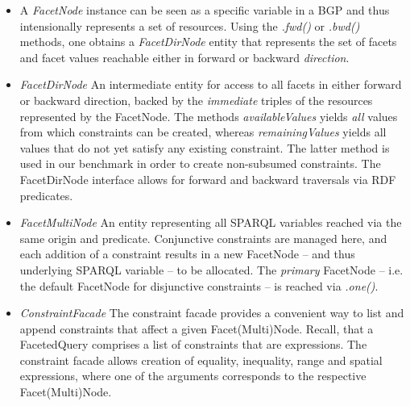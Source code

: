 \begin{itemize}
\item A \emph{FacetNode} instance can be seen as a specific variable in a BGP  and thus intensionally represents a set of resources.
Using the \emph{.fwd()} or \emph{.bwd()} methods, one obtains a \emph{FacetDirNode} entity that represents the set of facets and facet values
reachable either in forward or backward \emph{direction}. 
 
\item \emph{FacetDirNode} An intermediate entity for access to all facets in either forward or backward direction, backed by the \emph{immediate} triples of the resources represented by the FacetNode.
The methods \emph{availableValues} yields \emph{all} values from which constraints can be created, whereas \emph{remainingValues} yields
all values that do not yet satisfy any existing constraint. The latter method is used in our benchmark in order to create non-subsumed constraints. 
The FacetDirNode interface allows for forward and backward traversals via RDF predicates.

\item \emph{FacetMultiNode} An entity representing all SPARQL variables reached via the same origin and predicate.
Conjunctive constraints are managed here, and each addition of a constraint results in a new FacetNode -- and thus underlying SPARQL variable -- to
be allocated.
The \emph{primary} FacetNode -- i.e. the default FacetNode for disjunctive constraints -- is reached via \emph{.one()}.
\item \emph{ConstraintFacade} The constraint facade provides a convenient way to list and append constraints that affect a given Facet(Multi)Node.
Recall, that a FacetedQuery comprises a list of constraints that are expressions.
The constraint facade allows creation of equality, inequality, range and spatial expressions, where
one of the arguments corresponds to the respective Facet(Multi)Node.
\end{itemize}

